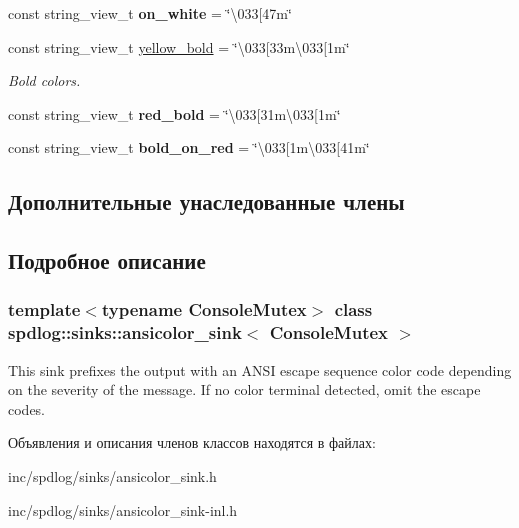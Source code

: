 \begin{DoxyCompactItemize}
\item 
\mbox{\label{classspdlog_1_1sinks_1_1ansicolor__sink_a66d34b12c2cacd8a743c67779603bfe3}} 
const string\+\_\+view\+\_\+t {\bfseries on\+\_\+white} = \char`\"{}\textbackslash{}033\mbox{[}47m\char`\"{}
\item 
\mbox{\label{classspdlog_1_1sinks_1_1ansicolor__sink_a91f7c688fda652cb33231a471a9aa5d4}} 
const string\+\_\+view\+\_\+t \hyperlink{classspdlog_1_1sinks_1_1ansicolor__sink_a91f7c688fda652cb33231a471a9aa5d4}{yellow\+\_\+bold} = \char`\"{}\textbackslash{}033\mbox{[}33m\textbackslash{}033\mbox{[}1m\char`\"{}
\begin{DoxyCompactList}\small\item\em Bold colors. \end{DoxyCompactList}\item 
\mbox{\label{classspdlog_1_1sinks_1_1ansicolor__sink_a3d6b40a04c0ab0629ef2a84377fc768e}} 
const string\+\_\+view\+\_\+t {\bfseries red\+\_\+bold} = \char`\"{}\textbackslash{}033\mbox{[}31m\textbackslash{}033\mbox{[}1m\char`\"{}
\item 
\mbox{\label{classspdlog_1_1sinks_1_1ansicolor__sink_a44572fc060dc369cc1388a1e391a7aba}} 
const string\+\_\+view\+\_\+t {\bfseries bold\+\_\+on\+\_\+red} = \char`\"{}\textbackslash{}033\mbox{[}1m\textbackslash{}033\mbox{[}41m\char`\"{}
\end{DoxyCompactItemize}
\subsection*{Дополнительные унаследованные члены}


\subsection{Подробное описание}
\subsubsection*{template$<$typename Console\+Mutex$>$\newline
class spdlog\+::sinks\+::ansicolor\+\_\+sink$<$ Console\+Mutex $>$}

This sink prefixes the output with an A\+N\+SI escape sequence color code depending on the severity of the message. If no color terminal detected, omit the escape codes. 

Объявления и описания членов классов находятся в файлах\+:\begin{DoxyCompactItemize}
\item 
inc/spdlog/sinks/ansicolor\+\_\+sink.\+h\item 
inc/spdlog/sinks/ansicolor\+\_\+sink-\/inl.\+h\end{DoxyCompactItemize}
